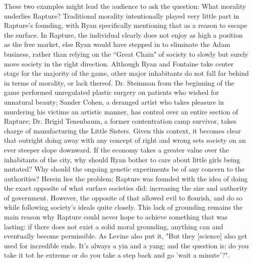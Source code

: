 \documentclass{article}
\begin{document}
These two examples might lead the audience to ask the question: What morality underlies Rapture? Traditional 
morality intentionally played very little part in Rapture's founding, with Ryan specifically mentioning that
as a reason to escape the surface. In Rapture, the individual clearly does not enjoy as high a position as 
the free market, else Ryan would have stepped in to eliminate the Adam business, rather than relying on the 
``Great Chain" of society to slowly but surely move society in the right direction. Although Ryan and 
Fontaine take center stage for the majority of the game, other major inhabitants do not fall far behind 
in terms of morality, or lack thereof. Dr. Steinman from the beginning of the game performed unregulated
plastic surgery on patients who wished for unnatural beauty; Sander Cohen, a deranged artist who takes pleasure
in murdering his victims an artistic manner, has control over an entire section of Rapture; 
Dr. Brigid Tenenbaum, a former contentration
camp survivor, takes charge of manufacturing the Little Sisters. Given this context, it becomes clear that 
outright doing away with any concept of right and wrong sets society on an ever steeper slope downward. If 
the economy takes a greater value over the inhabitants of the city, why should Ryan bother to care about little 
girls being mutated? Why should the ongoing genetic experiments be of any concern to the authorities? Herein
lies the problem; Rapture was founded with the idea of doing the exact opposite of what surface societies did:
increasing the size and authority of government. However, the opposite of that allowed evil to flourish, and do
so while following society's ideals quite closely. This lack of grounding remains the main reason why Rapture
could never hope to achieve something that was lasting: if there does not exist a solid moral grounding,
anything can and eventually become permissible. As Levine also put it, "But they [science] also get used for 
incredible ends. It's always a yin and a yang; and the question is: do you take it tot he extreme or do you take 
a step back and go 'wait a minute'?"\textcite{LevineInterview}. 


\printbibliography 
\end{document}
